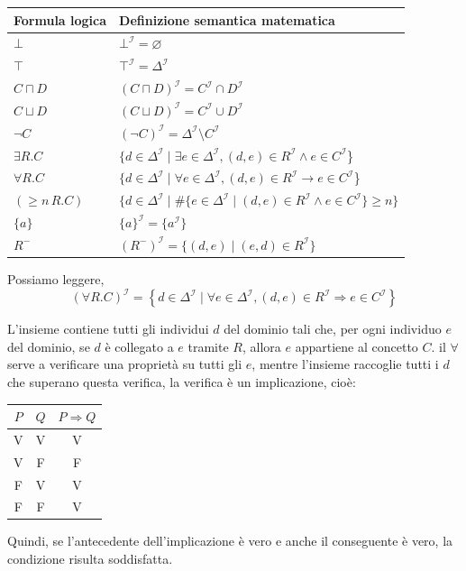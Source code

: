 \begin{center}
    \begingroup
    \small
    \renewcommand{\arraystretch}{1.3}
    \begin{tabular}{@{}ll@{}}
        \hline
        \textbf{Formula logica} & \textbf{Definizione semantica matematica} \\
        \hline
        \(\bot\) & \(\bot^{\mathcal I}=\varnothing\) \\
        \(\top\) & \(\top^{\mathcal I}=\Delta^{\mathcal I}\) \\
        \(C\sqcap D\) & \((C\sqcap D)^{\mathcal I}=C^{\mathcal I}\cap D^{\mathcal I}\) \\
        \(C\sqcup D\) & \((C\sqcup D)^{\mathcal I}=C^{\mathcal I}\cup D^{\mathcal I}\) \\
        \(\neg C\) & \((\neg C)^{\mathcal I}=\Delta^{\mathcal I}\setminus C^{\mathcal I}\) \\
        \(\exists R.C\) &
            \(\{d\in\Delta^{\mathcal I}\mid
              \exists e\in\Delta^{\mathcal I},(d,e)\in R^{\mathcal I}\land e\in C^{\mathcal I}\)\} \\
        \(\forall R.C\) &
            \(\{d\in\Delta^{\mathcal I}\mid
              \forall e\in\Delta^{\mathcal I},(d,e)\in R^{\mathcal I}\to e\in C^{\mathcal I}\)\} \\
        \((\geq n\,R.C)\) &
            \(\{d\in\Delta^{\mathcal I}\mid
              \#\{e\in\Delta^{\mathcal I}\mid(d,e)\in R^{\mathcal I}\land e\in C^{\mathcal I}\}\geq n\}\) \\
        \(\{a\}\) & \(\{a\}^{\mathcal I}=\{a^{\mathcal I}\}\) \\
        \(R^{-}\) & \((R^{-})^{\mathcal I}=\{(d,e)\mid(e,d)\in R^{\mathcal I}\}\) \\
        \hline
    \end{tabular}
    \endgroup
\end{center}
Possiamo leggere,
\[
(\forall R.C)^{\mathcal I}
=
\left\{
d\in\Delta^{\mathcal I}
\mid
\forall e\in\Delta^{\mathcal I},
(d,e)\in R^{\mathcal I}\Rightarrow e\in C^{\mathcal I}
\right\}
\]

L'insieme contiene tutti gli individui \(d\) del dominio tali che, per ogni individuo \(e\) del dominio, se \(d\) è collegato a \(e\) tramite \(R\), allora \(e\) appartiene al concetto \(C\).
il \(\forall\) serve a verificare una proprietà su tutti gli \(e\), mentre l'insieme raccoglie tutti i \(d\) che superano questa verifica, la verifica è un implicazione, cioè:
\begin{center}
\begin{tabular}{|c|c|c|}
\hline
$P$ & $Q$ & $P \Rightarrow Q$ \\
\hline
V & V & V \\
V & F & F \\
F & V & V \\
F & F & V \\
\hline
\end{tabular}
\end{center}
Quindi, se l'antecedente dell'implicazione è vero e anche il conseguente è vero,
la condizione risulta soddisfatta.

